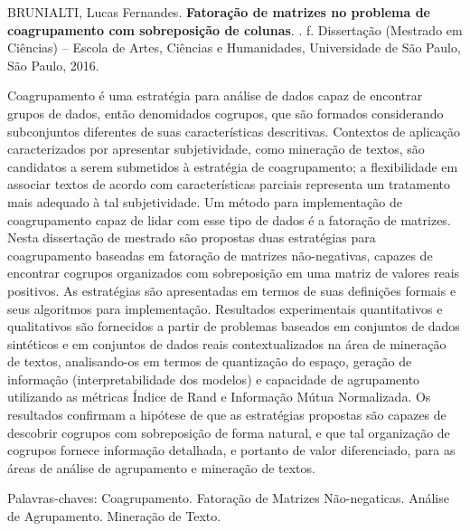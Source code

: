 \documentclass[
    12pt,                %
    oneside,            %
    a4paper,            %
    english,            %
    brazil                %
    ]{abntex2ppgsi}
\begin{document}
\setlength{\absparsep}{18pt} %
\begin{resumo}

%
%
%
%
\begin{flushleft}
BRUNIALTI, Lucas Fernandes. \textbf{Fatoração de matrizes no problema de coagrupamento com sobreposição de colunas}. \imprimirdata. \pageref{LastPage} f. Dissertação (Mestrado em Ciências) – Escola de Artes, Ciências e Humanidades, Universidade de São Paulo, São Paulo, 2016.
\end{flushleft}

Coagrupamento é uma estratégia para análise de dados capaz de encontrar grupos de dados, então denomidados cogrupos, que são formados considerando subconjuntos diferentes de suas características descritivas.
Contextos de aplicação caracterizados por apresentar subjetividade, como mineração de textos, são candidatos a serem submetidos à estratégia de coagrupamento; a flexibilidade em associar textos de acordo com características parciais representa um tratamento mais adequado à tal subjetividade.
Um método para implementação de coagrupamento capaz de lidar com esse tipo de dados é a fatoração de matrizes.
Nesta dissertação de mestrado são propostas duas estratégias para coagrupamento baseadas em fatoração de matrizes não-negativas, capazes de encontrar cogrupos organizados com sobreposição em uma matriz de valores reais positivos.
As estratégias são apresentadas em termos de suas definições formais e seus algoritmos para implementação.
Resultados experimentais quantitativos e qualitativos são fornecidos a partir de problemas baseados em conjuntos de dados sintéticos e em conjuntos de dados reais contextualizados na área de mineração de textos, analisando-os em termos de quantização do espaço, geração de informação (interpretabilidade dos modelos) e capacidade de agrupamento utilizando as métricas Índice de Rand e Informação Mútua Normalizada.
Os resultados confirmam a hipótese de que as estratégias propostas são capazes de descobrir cogrupos com sobreposição de forma natural, e que tal organização de cogrupos fornece informação detalhada, e portanto de valor diferenciado, para as áreas de análise de agrupamento e mineração de textos.

Palavras-chaves: Coagrupamento. Fatoração de Matrizes Não-negaticas. Análise de Agrupamento. Mineração de Texto.
\end{resumo}
\end{document}
